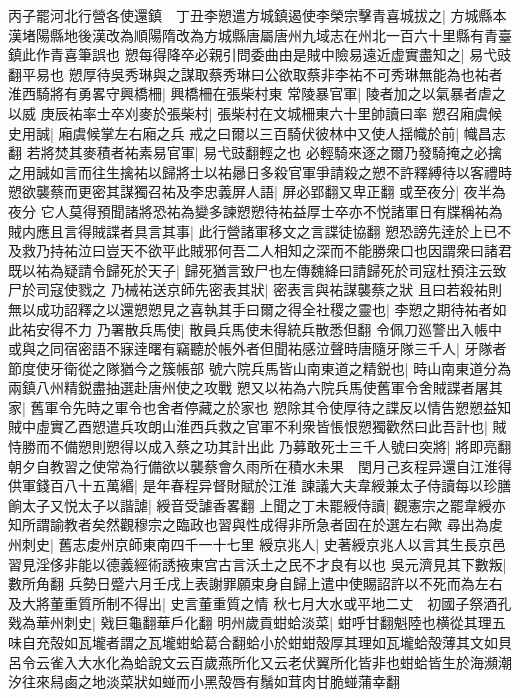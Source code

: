 丙子罷河北行營各使還鎮　丁丑李愬遣方城鎮遏使李榮宗擊青喜城拔之|{
	方城縣本漢堵陽縣地後漢改為順陽隋改為方城縣唐屬唐州九域志在州北一百六十里縣有青臺鎮此作青喜筆誤也}
愬每得降卒必親引問委曲由是賊中險易遠近虚實盡知之|{
	易弋豉翻平易也}
愬厚待吳秀琳與之謀取蔡秀琳曰公欲取蔡非李祐不可秀琳無能為也祐者淮西騎將有勇畧守興橋柵|{
	興橋柵在張柴村東}
常陵暴官軍|{
	陵者加之以氣暴者虐之以威}
庚辰祐率士卒刈麥於張柴村|{
	張柴村在文城柵東六十里帥讀曰率}
愬召廂虞候史用誠|{
	廂虞候掌左右廂之兵}
戒之曰爾以三百騎伏彼林中又使人揺幟於前|{
	幟昌志翻}
若將焚其麥積者祐素易官軍|{
	易弋豉翻輕之也}
必輕騎來逐之爾乃發騎掩之必擒之用誠如言而往生擒祐以歸將士以祐曏日多殺官軍爭請殺之愬不許釋縛待以客禮時愬欲襲蔡而更密其謀獨召祐及李忠義屏人語|{
	屏必郢翻又卑正翻}
或至夜分|{
	夜半為夜分}
它人莫得預聞諸將恐祐為變多諫愬愬待祐益厚士卒亦不悦諸軍日有牒稱祐為賊内應且言得賊諜者具言其事|{
	此行營諸軍移文之言諜徒協翻}
愬恐謗先逹於上已不及救乃持祐泣曰豈天不欲平此賊邪何吾二人相知之深而不能勝衆口也因謂衆曰諸君既以祐為疑請令歸死於天子|{
	歸死猶言致尸也左傳魏絳曰請歸死於司寇杜預注云致尸於司寇使戮之}
乃械祐送京師先密表其狀|{
	密表言與祐謀襲蔡之狀}
且曰若殺祐則無以成功詔釋之以還愬愬見之喜執其手曰爾之得全社稷之靈也|{
	李愬之期待祐者如此祐安得不力}
乃署散兵馬使|{
	散員兵馬使未得統兵散悉但翻}
令佩刀廵警出入帳中或與之同宿密語不寐逹曙有竊聽於帳外者但聞祐感泣聲時唐隨牙隊三千人|{
	牙隊者節度使牙衛從之隊猶今之簇帳部}
號六院兵馬皆山南東道之精鋭也|{
	時山南東道分為兩鎮八州精鋭盡抽選赴唐州使之攻戰}
愬又以祐為六院兵馬使舊軍令舍賊諜者屠其家|{
	舊軍令先時之軍令也舍者停藏之於家也}
愬除其令使厚待之諜反以情告愬愬益知賊中虛實乙酉愬遣兵攻朗山淮西兵救之官軍不利衆皆悵恨愬獨歡然曰此吾計也|{
	賊恃勝而不備愬則愬得以成入蔡之功其計出此}
乃募敢死士三千人號曰突將|{
	將即亮翻}
朝夕自教習之使常為行備欲以襲蔡會久雨所在積水未果　閏月己亥程异還自江淮得供軍錢百八十五萬緡|{
	是年春程异督財賦於江淮}
諫議大夫韋綬兼太子侍讀每以珍膳餉太子又悦太子以諧謔|{
	綬音受謔香畧翻}
上聞之丁未罷綬侍讀|{
	觀憲宗之罷韋綬亦知所謂諭教者矣然觀穆宗之臨政也習與性成得非所急者固在於選左右歟}
尋出為䖍州刺史|{
	舊志䖍州京師東南四千一十七里}
綬京兆人|{
	史著綬京兆人以言其生長京邑習見淫侈非能以德義經術誘掖東宫古言沃土之民不才良有以也}
吳元濟見其下數叛|{
	數所角翻}
兵勢日蹙六月壬戌上表謝罪願束身自歸上遣中使賜詔許以不死而為左右及大將董重質所制不得出|{
	史言董重質之情}
秋七月大水或平地二丈　初國子祭酒孔戣為華州刺史|{
	戣巨龜翻華戶化翻}
明州歲貢蚶蛤淡菜|{
	蚶呼甘翻魁陸也横從其理五味自充殻如瓦壠者謂之瓦壠蚶蛤葛合翻蛤小於蚶蚶殻厚其理如瓦壠蛤殻薄其文如貝呂令云雀入大水化為蛤說文云百歲燕所化又云老伏翼所化皆非也蚶蛤皆生於海瀕潮汐往來舄鹵之地淡菜狀如䗒而小黑殻唇有鬚如茸肉甘脆䗒蒲幸翻}
